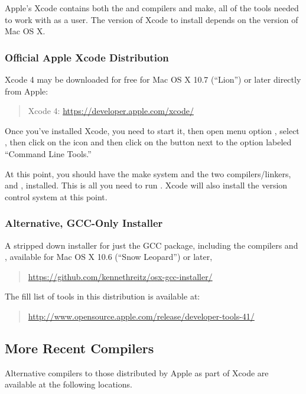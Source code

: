 Apple's Xcode contains both the \clang and \gpp compilers and make, all of the tools 
needed to work with \Stan as a user. 
The version of Xcode to install depends on the
version of Mac OS X.  

\subsubsection{Official Apple Xcode Distribution}

Xcode 4 may be downloaded for free for Mac OS X 10.7 (``Lion'') or
later directly from Apple:

\begin{quote}
Xcode 4: \url{https://developer.apple.com/xcode/}
\end{quote}

Once you've installed Xcode, you need to start it, then open
menu option , select , then click on the
 icon and then click on the  button next
to the option labeled ``Command Line Tools.''

At this point, you should have the make system  and the two
\Cpp compilers/linkers, \gpp and \clang, installed.  This is all you
need to run \Stan.  Xcode will also install the  version
control system at this point.

\subsubsection{Alternative, GCC-Only Installer}

A stripped down installer for just the GCC package, including the \Cpp
compilers  and , available for 
Mac OS X 10.6 (``Snow Leopard'') or later,
%
\begin{quote}
\url{https://github.com/kennethreitz/osx-gcc-installer/}
\end{quote}
%
The fill list of tools in this distribution is available at:
%
\begin{quote}
\url{http://www.opensource.apple.com/release/developer-tools-41/}
\end{quote}



\subsection{More Recent Compilers}

Alternative compilers to those distributed by Apple as part of Xcode
are available at the following locations.

